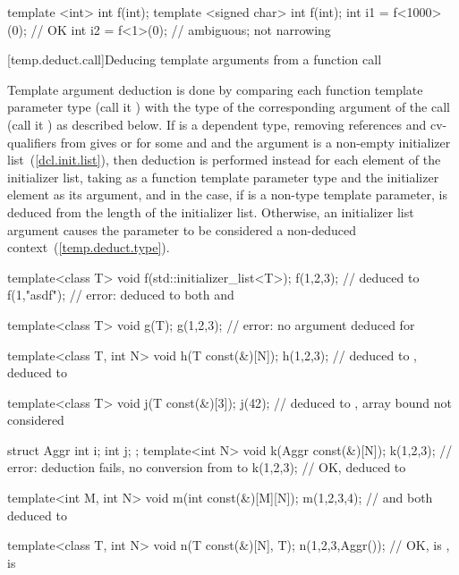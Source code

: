 \begin{codeblock}
template <int> int f(int);
template <signed char> int f(int);
int i1 = f<1000>(0);         // OK
int i2 = f<1>(0);            // ambiguous; not narrowing
\end{codeblock}
\exitexample

[temp.deduct.call]{Deducing template arguments from a function call}

\pnum
Template argument deduction is done by comparing each function
template parameter type (call it
)
with the type of the corresponding argument of the call (call it
)
as described below.
If  is a dependent type,
removing references and cv-qualifiers from  gives
or 
for some  and  and the
argument is a non-empty initializer list~(\ref{dcl.init.list}), then deduction is
performed instead for each element of the initializer list, taking
 as a function template parameter type and the initializer
element as its argument,
and in the  case, if  is a non-type template parameter,
 is deduced from the length of the initializer list.
Otherwise, an initializer list argument causes the
parameter to be considered a non-deduced context~(\ref{temp.deduct.type}).
\enterexample
\begin{codeblock}
template<class T> void f(std::initializer_list<T>);
f({1,2,3});                 //  deduced to 
f({1,"asdf"});              // error:  deduced to both  and 

template<class T> void g(T);
g({1,2,3});                 // error: no argument deduced for 

template<class T, int N> void h(T const(&)[N]);
h({1,2,3});                 //  deduced to ,  deduced to 

template<class T> void j(T const(&)[3]);
j({42});                    //  deduced to , array bound not considered

struct Aggr { int i; int j; };
template<int N> void k(Aggr const(&)[N]);
k({1,2,3});                 // error: deduction fails, no conversion from  to 
k({{1},{2},{3}});           // OK,  deduced to 

template<int M, int N> void m(int const(&)[M][N]);
m({{1,2},{3,4}});           //  and  both deduced to 

template<class T, int N> void n(T const(&)[N], T);
n({{1},{2},{3}},Aggr());    // OK,  is ,  is 
\end{codeblock}
